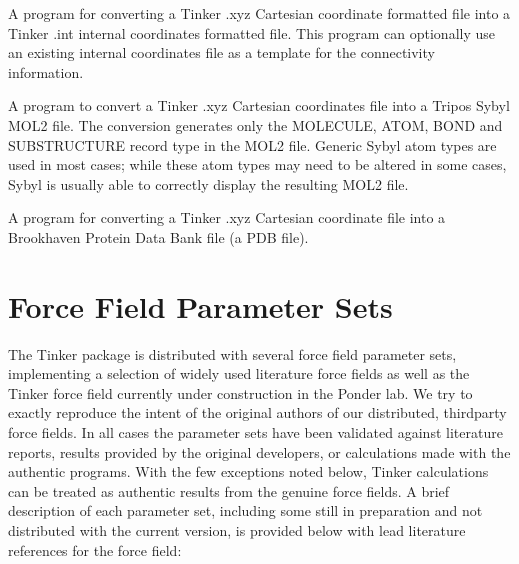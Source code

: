 \documentclass[letterpaper,11pt,english]{sphinxmanual}
\begin{document}

A program for converting a Tinker .xyz Cartesian coordinate formatted file into a Tinker .int internal coordinates formatted file. This program can optionally use an existing internal coordinates file as a template for the connectivity information.


A program to convert a Tinker .xyz Cartesian coordinates file into a Tripos Sybyl MOL2 file. The conversion generates only the MOLECULE, ATOM, BOND and SUBSTRUCTURE record type in the MOL2 file. Generic Sybyl atom types are used in most cases; while these atom types may need to be altered in some cases, Sybyl is usually able to correctly display the resulting MOL2 file.


A program for converting a Tinker .xyz Cartesian coordinate file into a Brookhaven Protein Data Bank file (a PDB file).


\chapter{Force Field Parameter Sets}
\label{\detokenize{text/parameters:force-field-parameter-sets}}\label{\detokenize{text/parameters::doc}}
The Tinker package is distributed with several force field parameter sets, implementing a selection of widely used literature force fields as well as the Tinker force field currently under construction in the Ponder lab. We try to exactly reproduce the intent of the original authors of our distributed, third\sphinxhyphen{}party force fields. In all cases the parameter sets have been validated against literature reports, results provided by the original developers, or calculations made with the authentic programs. With the few exceptions noted below, Tinker calculations can be treated as authentic results from the genuine force fields. A brief description of each parameter set, including some still in preparation and not distributed with the current version, is provided below with lead literature references for the force field:

\end{document}
